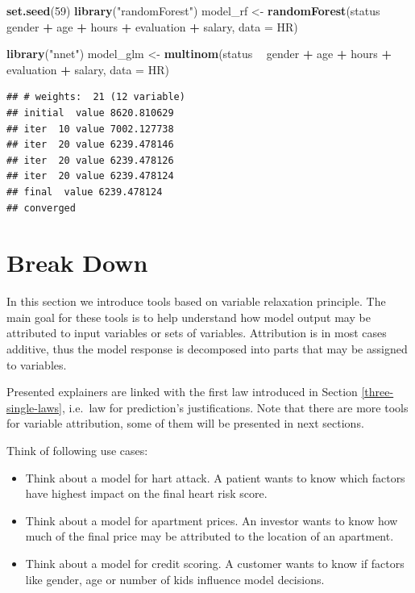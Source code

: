 \documentclass[]{book}
\newenvironment{Shaded}{\begin{snugshade}}{\end{snugshade}}
\newcommand{\DataTypeTok}[1]{\textcolor[rgb]{0.13,0.29,0.53}{#1}}
\newcommand{\DecValTok}[1]{\textcolor[rgb]{0.00,0.00,0.81}{#1}}
\newcommand{\KeywordTok}[1]{\textcolor[rgb]{0.13,0.29,0.53}{\textbf{#1}}}
\newcommand{\NormalTok}[1]{#1}
\newcommand{\OperatorTok}[1]{\textcolor[rgb]{0.81,0.36,0.00}{\textbf{#1}}}
\newcommand{\StringTok}[1]{\textcolor[rgb]{0.31,0.60,0.02}{#1}}
\providecommand{\tightlist}{%
  \setlength{\itemsep}{0pt}\setlength{\parskip}{0pt}}
\theoremstyle{definition}
\theoremstyle{definition}
\theoremstyle{definition}
\theoremstyle{remark}
\begin{document}
\begin{Shaded}
\begin{Highlighting}[]
\KeywordTok{set.seed}\NormalTok{(}\DecValTok{59}\NormalTok{)}
\KeywordTok{library}\NormalTok{(}\StringTok{"randomForest"}\NormalTok{)}
\NormalTok{model_rf <-}\StringTok{ }\KeywordTok{randomForest}\NormalTok{(status }\OperatorTok{~}\StringTok{ }\NormalTok{gender }\OperatorTok{+}\StringTok{ }\NormalTok{age }\OperatorTok{+}\StringTok{ }\NormalTok{hours }\OperatorTok{+}\StringTok{ }\NormalTok{evaluation }\OperatorTok{+}\StringTok{ }\NormalTok{salary, }\DataTypeTok{data =}\NormalTok{ HR)}

\KeywordTok{library}\NormalTok{(}\StringTok{"nnet"}\NormalTok{)}
\NormalTok{model_glm <-}\StringTok{ }\KeywordTok{multinom}\NormalTok{(status }\OperatorTok{~}\StringTok{ }\NormalTok{gender }\OperatorTok{+}\StringTok{ }\NormalTok{age }\OperatorTok{+}\StringTok{ }\NormalTok{hours }\OperatorTok{+}\StringTok{ }\NormalTok{evaluation }\OperatorTok{+}\StringTok{ }\NormalTok{salary, }\DataTypeTok{data =}\NormalTok{ HR)}
\end{Highlighting}
\end{Shaded}

\begin{verbatim}
## # weights:  21 (12 variable)
## initial  value 8620.810629 
## iter  10 value 7002.127738
## iter  20 value 6239.478146
## iter  20 value 6239.478126
## iter  20 value 6239.478124
## final  value 6239.478124 
## converged
\end{verbatim}

\hypertarget{break-down}{%
\chapter{Break Down}\label{break-down}}

In this section we introduce tools based on variable relaxation
principle. The main goal for these tools is to help understand how model
output may be attributed to input variables or sets of variables.
Attribution is in most cases additive, thus the model response is
decomposed into parts that may be assigned to variables.

Presented explainers are linked with the first law introduced in Section
\ref{three-single-laws}, i.e.~law for prediction's justifications. Note
that there are more tools for variable attribution, some of them will be
presented in next sections.

Think of following use cases:

\begin{itemize}
\tightlist
\item
  Think about a model for hart attack. A patient wants to know which
  factors have highest impact on the final heart risk score.
\item
  Think about a model for apartment prices. An investor wants to know
  how much of the final price may be attributed to the location of an
  apartment.
\item
  Think about a model for credit scoring. A customer wants to know if
  factors like gender, age or number of kids influence model decisions.
\end{itemize}
\end{document}
